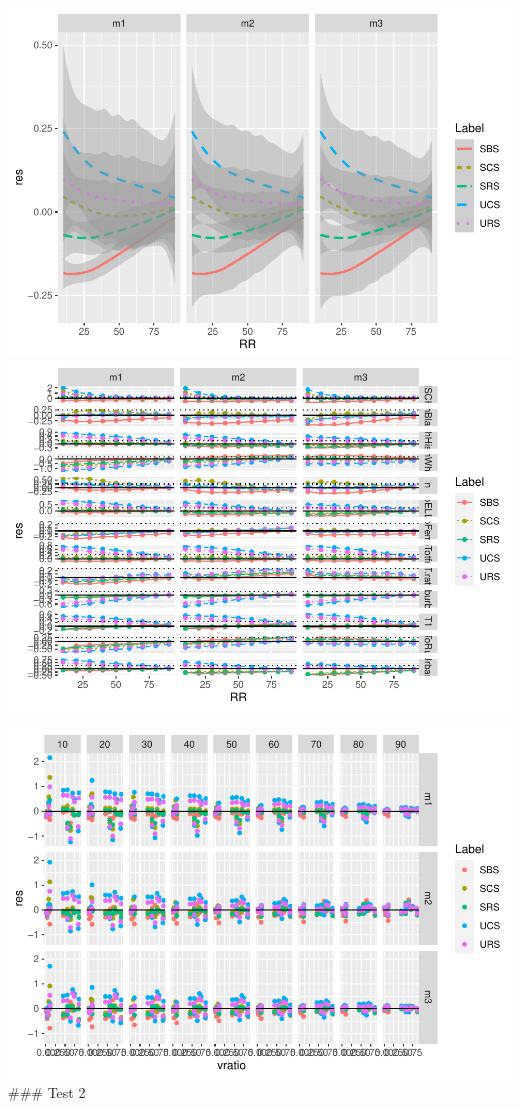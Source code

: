 \documentclass[
  english,
  man,floatsintext]{apa6}
\begin{document}
\includegraphics{5---Analysis_files/figure-latex/unnamed-chunk-25-1.pdf} \includegraphics{5---Analysis_files/figure-latex/unnamed-chunk-25-2.pdf}

\includegraphics{5---Analysis_files/figure-latex/unnamed-chunk-26-1.pdf}
\#\#\# Test 2
\end{document}
